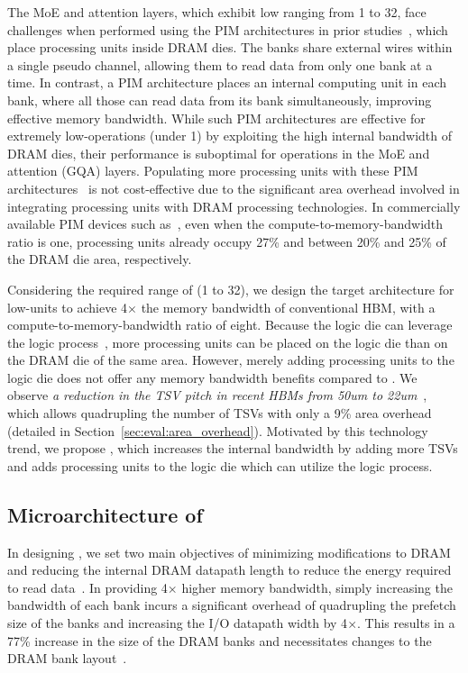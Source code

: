 The MoE and attention layers, which exhibit low \opb ranging from 1 to 32, face challenges when performed using the PIM architectures in prior studies~\cite{isca-2021-hbm-pim, isscc-2022-aim, asplos-2024-attacc, asplos-2024-neupim}, which place processing units inside DRAM dies. 
The banks share external wires within a single pseudo channel, allowing them to read data from only one bank at a time. 
In contrast, a PIM architecture places an internal computing unit in each bank, where all those can read data from its bank simultaneously, improving effective memory bandwidth.
While such PIM architectures are effective for extremely low-\opb operations (under 1) by exploiting the high internal bandwidth of DRAM dies, their performance is suboptimal for operations in the MoE and attention (GQA) layers. 
Populating more processing units with these PIM architectures~\cite{isca-2021-hbm-pim, isscc-2022-aim} is not cost-effective due to the significant area overhead involved in integrating processing units with DRAM processing technologies.
In commercially available PIM devices such as~\cite{isca-2021-hbm-pim, isscc-2022-aim}, even when the compute-to-memory-bandwidth ratio is one, processing units already occupy 27\% and between 20\% and 25\% of the DRAM die area, respectively.

Considering the required range of \opb (1 to 32), we design the target architecture for low-\opb units to achieve 4$\times$ the memory bandwidth of conventional HBM, with a compute-to-memory-bandwidth ratio of eight. 
Because the logic die can leverage the logic process~\cite{imw-2017-hbm-dram-technology, todaes-2021-nmp-cnn-hbm}, more processing units can be placed on the logic die than on the DRAM die of the same area.
However, merely adding processing units to the logic die does not offer any memory bandwidth benefits compared to \highp.
We observe \emph{a reduction in the TSV pitch in recent HBMs from 50um to 22um}~\cite{SKhynix-tsv-pitch}, which allows quadrupling the number of TSVs with only a 9\% area overhead (detailed in Section~\ref{sec:eval:area_overhead}).
Motivated by this technology trend, we propose \lowp, which increases the internal bandwidth by adding more TSVs and adds processing units to the logic die which can utilize the logic process.



\subsection{Microarchitecture of \lowp}
In designing \lowp, we set two main objectives of minimizing modifications to DRAM and reducing the internal DRAM datapath length to reduce the energy required to read data~\cite{MICRO-2017-fine-grained-dram}.
In providing 4$\times$ higher memory bandwidth, simply increasing the bandwidth of each bank incurs a significant overhead of quadrupling the prefetch size of the banks and increasing the I/O datapath width by 4$\times$.
This results in a 77\% increase in the size of the DRAM banks and necessitates changes to the DRAM bank layout~\cite{MICRO-2017-fine-grained-dram}.

